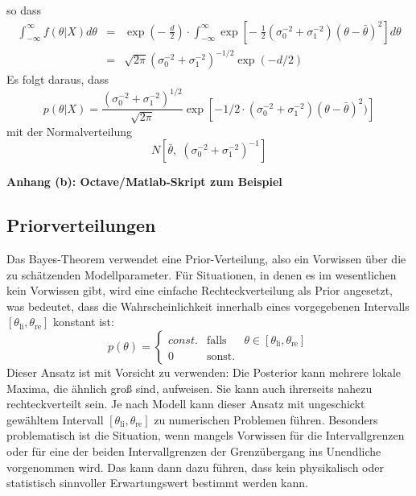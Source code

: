so dass
\begin{equation}
\begin{array}{rcl}
\int_{-\infty}^{\infty} f(\theta|X) d \theta & = & 
\exp \left( -\; \frac{d}{2} \right) \cdot \int_{-\infty}^{\infty} 
\exp \left[ - \; \frac{1}{2} (\sigma_0^{-2}+ \sigma_1^{-2})(\theta - \bar{\theta})^2
\right] d \theta \\
&=& \sqrt{2 \pi} (\sigma_0^{-2}+\sigma_1^{-2})^{-1/2} \exp (-d/2) 
\end{array}
\end{equation}
Es folgt daraus, dass 
\begin{equation}
p(\theta|X) = \frac{(\sigma_0^{-2}+\sigma_1^{-2})^{1/2}}{\sqrt{2\pi}}
\exp \left[- 1/2 \cdot (\sigma_0^{-2}+\sigma_1^{-2})(\theta-\bar{\theta})^2)\right]
\end{equation}
mit der Normalverteilung
\begin{equation}
N\left[\bar{\theta}, \; (\sigma_0^{-2} + \sigma_1^{-2})^{-1} \right]
\end{equation}

\newpage
\textbf{Anhang (b): Octave/Matlab-Skript zum Beispiel}


\newpage
\subsection{Priorverteilungen}
Das Bayes-Theorem verwendet eine Prior-Verteilung, also ein Vorwissen über die zu schätzenden Modellparameter.
Für Situationen, in denen es im wesentlichen kein Vorwissen gibt, wird eine einfache Rechteckverteilung als Prior angesetzt, was bedeutet, dass die Wahrscheinlichkeit innerhalb eines vorgegebenen Intervalls $[\theta_\mathrm{li},\theta_\mathrm{re}]$ konstant ist:
\[
p(\theta) = \left\{\begin{array}{lll}
const. & \textrm{falls} & \theta \in [\theta_\mathrm{li},\theta_\mathrm{re}]\\
0 & \textrm{sonst.} &
\end{array}\right.
\]
Dieser Ansatz ist mit Vorsicht zu verwenden:
Die Posterior kann mehrere lokale Maxima, die ähnlich groß sind, aufweisen.
Sie kann auch ihrerseits nahezu rechteckverteilt sein.
Je nach Modell kann dieser Ansatz mit ungeschickt gewähltem Intervall
$[\theta_\mathrm{li},\theta_\mathrm{re}]$ zu numerischen Problemen führen.
Besonders problematisch ist die Situation, wenn mangels Vorwissen für die Intervallgrenzen
oder für eine der beiden Intervallgrenzen der Grenzübergang ins Unendliche vorgenommen wird.
Das kann dann dazu führen, dass kein physikalisch oder statistisch sinnvoller
Erwartungswert bestimmt werden kann. 


